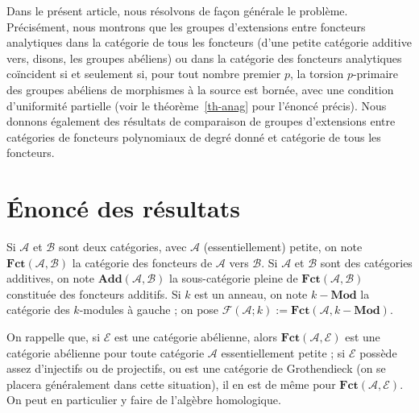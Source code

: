 \documentclass[a4paper,10pt]{article}
\newcommand{\A}{{\mathcal{A}}}
\newcommand{\B}{{\mathcal{B}}}
\newcommand{\F}{{\mathcal{F}}}
\newcommand{\fct}{\mathbf{Fct}}
\newcommand{\add}{\mathbf{Add}}
\newcommand{\E}{{\mathcal{E}}}
\theoremstyle{definition}
\theoremstyle{remark}
\begin{document}
Dans le présent article, nous résolvons de façon générale le problème. Précisément, nous montrons que les groupes d'extensions entre foncteurs analytiques dans la catégorie de tous les foncteurs (d'une petite catégorie additive vers, disons, les groupes abéliens) ou dans la catégorie des foncteurs analytiques coïncident si et seulement si, pour tout nombre premier $p$, la torsion $p$-primaire des groupes abéliens de morphismes à la source est bornée, avec une condition d'uniformité partielle (voir le théorème~\ref{th-anag} pour l'énoncé précis). Nous donnons également des résultats de comparaison de groupes d'extensions entre catégories de foncteurs polynomiaux de degré donné et catégorie de tous les foncteurs.

\section{Énoncé des résultats}\label{sr}

Si $\A$ et $\B$ sont deux catégories, avec $\A$ (essentiellement) petite, on note $\fct(\A,\B)$ la catégorie des foncteurs de $\A$ vers $\B$. Si $\A$ et $\B$ sont des catégories additives, on note $\add(\A,\B)$ la sous-catégorie pleine de $\fct(\A,\B)$ constituée des foncteurs additifs. Si $k$ est un anneau, on note $k-\mathbf{Mod}$ la catégorie des $k$-modules à gauche ; on pose $\F(\A;k):=\fct(\A,k-\mathbf{Mod})$.

On rappelle que, si $\E$ est une catégorie abélienne, alors $\fct(\A,\E)$ est une catégorie abélienne pour toute catégorie $\A$ essentiellement petite ; si $\E$ possède assez d'injectifs ou de projectifs, ou est une catégorie de Grothendieck (on se placera généralement dans cette situation), il en est de même pour $\fct(\A,\E)$. On peut en particulier y faire de l'algèbre homologique.
\end{document}

